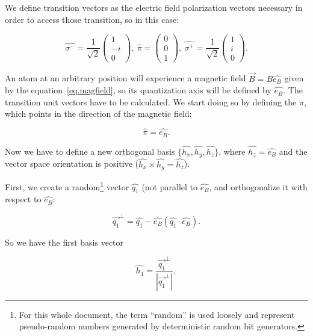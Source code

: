 \documentclass[12pt,a4paper,twoside]{article}
\begin{document}
We define transition vectors as the electric field polarization vectors necessary in order to access those transition, so in this case:

\begin{equation*}
    \hat{\sigma^{-}} = \dfrac{1}{\sqrt{2}}
	\begin{pmatrix}
		1\\
		-i\\
		0
	\end{pmatrix},\ 
	\hat{\pi} = 
	\begin{pmatrix}
		0\\
		0\\
		1
	\end{pmatrix},\ 
	\hat{\sigma^{+}} = \dfrac{1}{\sqrt{2}}
	\begin{pmatrix}
		1\\
		i\\
		0
	\end{pmatrix}.
\end{equation*}


An atom at an arbitrary position will experience a magnetic field $\vec{B} = B\hat{e_B}$ given by the equation~\ref{eq.magfield}, so its quantization axis will be defined by $\hat{e_B}$. The transition unit vectors have to be calculated. We start doing so by defining the $\pi$, which points in the direction of the magnetic field:

\begin{equation}
	\hat{\pi} = \hat{e_B}.
\end{equation}

Now we have to define a new orthogonal basis $\{\hat{h_x},\hat{h_y},\hat{h_z}\}$, where $\hat{h_z} = \hat{e_B}$ and the vector space orientation is positive ($\hat{h_x}\times\hat{h_y} = \hat{h_z}$).

First, we create a random\footnote{For this whole document, the term ``random'' is used loosely and represent pseudo-random numbers generated by deterministic random bit generators.} vector $\hat{q_1}$ (not parallel to $\hat{e_B}$, and orthogonalize it with respect to $\hat{e_B}$:

\begin{equation*}
	\vec{q_1}^{\perp} = \hat{q_1} - \hat{e_B}(\hat{q_1}\cdot\hat{e_B}).
\end{equation*}

\noindent
So we have the first basis vector

\begin{equation}
	\hat{h_1} = \dfrac{\vec{q_1}^{\perp}}{\left| \vec{q_1}^{\perp} \right|},
\end{equation}
\end{document}
